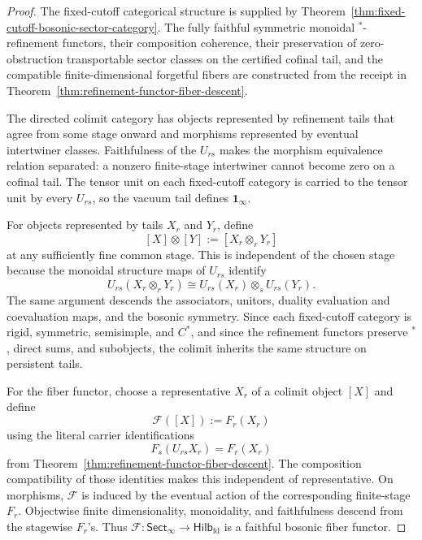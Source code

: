 \documentclass[11pt]{article}
\begin{document}
\begin{proof}
The fixed-cutoff categorical structure is supplied by
Theorem~\ref{thm:fixed-cutoff-bosonic-sector-category}. The fully faithful symmetric monoidal
\(^*\)-refinement functors, their composition coherence, their preservation of zero-obstruction
transportable sector classes on the certified cofinal tail, and the compatible finite-dimensional
forgetful fibers are constructed from the receipt in
Theorem~\ref{thm:refinement-functor-fiber-descent}.

The directed colimit category has objects represented by refinement tails that agree from some stage onward
and morphisms represented by eventual intertwiner classes. Faithfulness of the \(U_{rs}\) makes
the morphism equivalence relation separated: a nonzero finite-stage intertwiner cannot become
zero on a cofinal tail. The tensor unit on each fixed-cutoff category is carried to the tensor
unit by every \(U_{rs}\), so the vacuum tail defines \(\mathbf 1_\infty\).

For objects represented by tails \(X_r\) and \(Y_r\), define
\[
[X]\otimes [Y]:=[X_r\otimes_r Y_r]
\]
at any sufficiently fine common stage. This is independent of the chosen stage because the
monoidal structure maps of \(U_{rs}\) identify
\[
U_{rs}(X_r\otimes_r Y_r)
\cong
U_{rs}(X_r)\otimes_s U_{rs}(Y_r).
\]
The same argument descends the associators, unitors, duality evaluation and coevaluation maps,
and the bosonic symmetry. Since each fixed-cutoff category is rigid, symmetric, semisimple, and
\(C^*\), and since the refinement functors preserve \(^*\), direct sums, and subobjects, the
colimit inherits the same structure on persistent tails.

For the fiber functor, choose a representative \(X_r\) of a colimit object \([X]\) and define
\[
\mathcal F([X]):=F_r(X_r)
\]
using the literal carrier identifications
\[
F_s(U_{rs}X_r)=F_r(X_r)
\]
from Theorem~\ref{thm:refinement-functor-fiber-descent}. The composition compatibility of those
identities makes this independent of representative. On morphisms, \(\mathcal F\) is induced
by the eventual action of the corresponding finite-stage \(F_r\). Objectwise finite
dimensionality, monoidality, and faithfulness descend from the stagewise \(F_r\)'s. Thus
\(\mathcal F:\mathsf{Sect}_\infty\to\mathsf{Hilb}_{\mathrm{fd}}\) is a faithful bosonic fiber
functor.
\end{proof}
\end{document}
